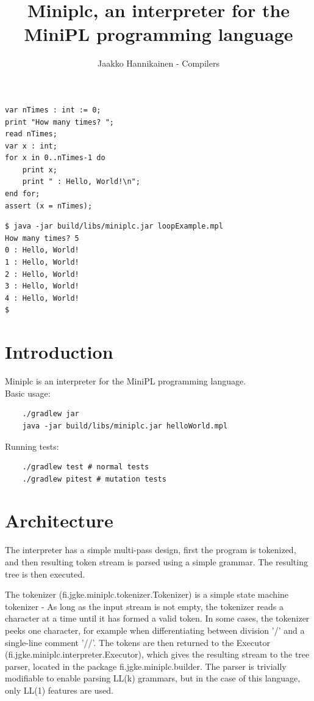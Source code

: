 \documentclass{article}
\author{Jaakko Hannikainen - Compilers}
\title{Miniplc, an interpreter for the MiniPL programming language}
\begin{document}
\maketitle

\noindent
\begin{minipage}{0.49\textwidth}
\begin{verbatim}
var nTimes : int := 0;
print "How many times? ";
read nTimes;
var x : int;
for x in 0..nTimes-1 do
    print x;
    print " : Hello, World!\n";
end for;
assert (x = nTimes);
\end{verbatim}
\end{minipage}
\begin{minipage}{0.49\textwidth}
\begin{verbatim}
$ java -jar build/libs/miniplc.jar loopExample.mpl
How many times? 5
0 : Hello, World!
1 : Hello, World!
2 : Hello, World!
3 : Hello, World!
4 : Hello, World!
$
\end{verbatim}
\end{minipage}

\vfill

\section{Introduction}
Miniplc is an interpreter for the MiniPL programming language. \\[1.5em]

\noindent
Basic usage:
\begin{verbatim}
    ./gradlew jar
    java -jar build/libs/miniplc.jar helloWorld.mpl
\end{verbatim}

\noindent
Running tests:
\begin{verbatim}
    ./gradlew test # normal tests
    ./gradlew pitest # mutation tests
\end{verbatim}

\vfill

\newpage
\section{Architecture}
\label{sec:architecture}
The interpreter has a simple multi-pass design, first the program is tokenized,
and then resulting token stream is parsed using a simple grammar. The resulting
tree is then executed.

The tokenizer (fi.jgke.miniplc.tokenizer.Tokenizer) is a simple state machine
tokenizer - As long as the input stream is not empty, the tokenizer reads a
character at a time until it has formed a valid token. In some cases, the
tokenizer peeks one character, for example when differentiating between
division '/' and a single-line comment '//'. The tokens are then returned to
the Executor (fi.jgke.miniplc.interpreter.Executor), which gives the resulting
stream to the tree parser, located in the package fi.jgke.miniplc.builder. The
parser is trivially modifiable to enable parsing LL(k) grammars, but in the
case of this language, only LL(1) features are used.
\end{document}

